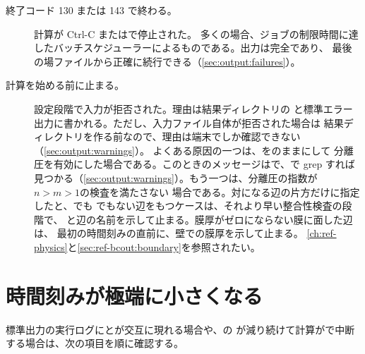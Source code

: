 \begin{description}
  \item[終了コード 130 または 143 で終わる。] 計算が Ctrl-C またはで停止された。
    多くの場合、ジョブの制限時間に達したバッチスケジューラーによるものである。出力は完全であり、
    最後の場ファイルから正確に続行できる（\cref{sec:output:failures}）。

  \item[計算を始める前に止まる。] 設定段階で入力が拒否された。理由は結果ディレクトリの
    と標準エラー出力に書かれる。ただし、入力ファイル自体が拒否された場合は
    結果ディレクトリを作る前なので、理由は端末でしか確認できない（\cref{sec:output:warnings}）。
    よくある原因の一つは、をのままにして
    分離圧を有効にした場合である。このときのメッセージはで、で grep すれば
    見つかる（\cref{sec:output:warnings}）。もう一つは、分離圧の指数が$n > m > 1$の検査を満たさない
    場合である。対になる辺の片方だけに指定したと、でも
    でもない辺をもつケースは、それより早い整合性検査の段階で、
    と辺の名前を示して止まる。膜厚がゼロにならない膜に面した辺は、
    最初の時間刻みの直前に、壁での膜厚を示して止まる。
    \cref{ch:ref-physics}と\cref{sec:ref-bcout:boundary}を参照されたい。
\end{description}

\section{時間刻みが極端に小さくなる}
\label{sec:trouble:dt}

標準出力の実行ログにとが交互に現れる場合や、の
が減り続けて計算がで中断する場合は、次の項目を順に確認する。

